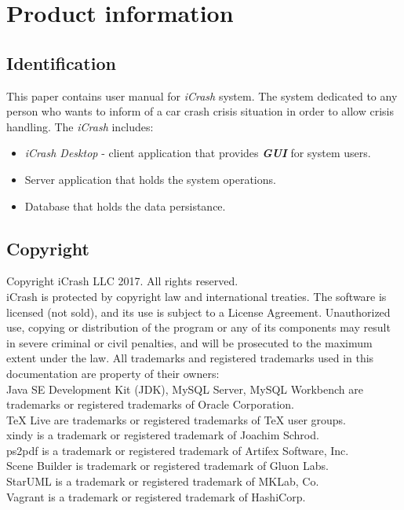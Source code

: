\chapter{Product information}
\label{chap:information}
\vspace{-6em}


\section{Identification}
This paper contains user manual for \emph{iCrash} system. The system
dedicated to any person who wants to inform of a car crash crisis situation in
order to allow crisis handling. The \emph{iCrash} includes:
\begin{itemize}
  \item  \emph{iCrash Desktop} - client application that provides
  \textbf{\emph{\gls{GUI}}} for system users.
  \item Server application that holds the system operations.
  \item Database that holds the data persistance.
\end{itemize}

\section{Copyright}

Copyright iCrash LLC 2017. All rights reserved.\\
iCrash is protected by copyright law and international treaties. The software is
licensed (not sold), and its use is subject to a License Agreement. Unauthorized
use, copying or distribution of the program or any of its components may result in severe criminal or civil penalties, and will be prosecuted to the maximum extent under the law.
All trademarks and registered trademarks used in this documentation are property
of their owners:\\
Java SE Development Kit (JDK), MySQL Server, MySQL Workbench are trademarks or
registered trademarks of Oracle Corporation.\\
TeX Live are trademarks or registered trademarks of TeX user groups.\\
xindy is a trademark or registered trademark of Joachim Schrod. \\
ps2pdf  is a trademark or registered trademark of Artifex Software, Inc.\\
Scene Builder is trademark or registered trademark of Gluon Labs.\\
StarUML is a trademark or registered trademark of MKLab, Co.\\
Vagrant is a trademark or registered trademark of HashiCorp.\\


